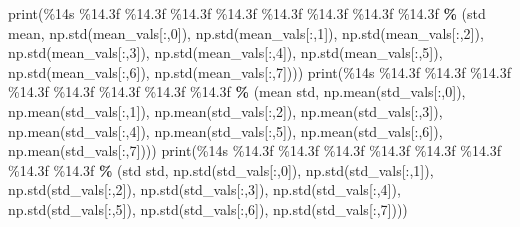 \documentclass[
]{book}
\newenvironment{Shaded}{\begin{snugshade}}{\end{snugshade}}
\newcommand{\BuiltInTok}[1]{#1}
\newcommand{\DecValTok}[1]{\textcolor[rgb]{0.00,0.00,0.81}{#1}}
\newcommand{\NormalTok}[1]{#1}
\newcommand{\OperatorTok}[1]{\textcolor[rgb]{0.81,0.36,0.00}{\textbf{#1}}}
\newcommand{\SpecialCharTok}[1]{\textcolor[rgb]{0.00,0.00,0.00}{#1}}
\newcommand{\StringTok}[1]{\textcolor[rgb]{0.31,0.60,0.02}{#1}}
\begin{document}
\begin{Shaded}
\begin{Highlighting}[]
  \BuiltInTok{print}\NormalTok{(}\StringTok{\textquotesingle{}}\SpecialCharTok{\%14s}\StringTok{ }\SpecialCharTok{\%14.3f}\StringTok{ }\SpecialCharTok{\%14.3f}\StringTok{ }\SpecialCharTok{\%14.3f}\StringTok{ }\SpecialCharTok{\%14.3f}\StringTok{ }\SpecialCharTok{\%14.3f}\StringTok{ }\SpecialCharTok{\%14.3f}\StringTok{ }\SpecialCharTok{\%14.3f}\StringTok{ }\SpecialCharTok{\%14.3f}\StringTok{\textquotesingle{}} \OperatorTok{\%}\NormalTok{ (}\StringTok{\textquotesingle{}std mean\textquotesingle{}}\NormalTok{, np.std(mean\_vals[:,}\DecValTok{0}\NormalTok{]), np.std(mean\_vals[:,}\DecValTok{1}\NormalTok{]), np.std(mean\_vals[:,}\DecValTok{2}\NormalTok{]), np.std(mean\_vals[:,}\DecValTok{3}\NormalTok{]), np.std(mean\_vals[:,}\DecValTok{4}\NormalTok{]), np.std(mean\_vals[:,}\DecValTok{5}\NormalTok{]), np.std(mean\_vals[:,}\DecValTok{6}\NormalTok{]), np.std(mean\_vals[:,}\DecValTok{7}\NormalTok{])))}
  \BuiltInTok{print}\NormalTok{(}\StringTok{\textquotesingle{}}\SpecialCharTok{\%14s}\StringTok{ }\SpecialCharTok{\%14.3f}\StringTok{ }\SpecialCharTok{\%14.3f}\StringTok{ }\SpecialCharTok{\%14.3f}\StringTok{ }\SpecialCharTok{\%14.3f}\StringTok{ }\SpecialCharTok{\%14.3f}\StringTok{ }\SpecialCharTok{\%14.3f}\StringTok{ }\SpecialCharTok{\%14.3f}\StringTok{ }\SpecialCharTok{\%14.3f}\StringTok{\textquotesingle{}} \OperatorTok{\%}\NormalTok{ (}\StringTok{\textquotesingle{}mean std\textquotesingle{}}\NormalTok{, np.mean(std\_vals[:,}\DecValTok{0}\NormalTok{]), np.mean(std\_vals[:,}\DecValTok{1}\NormalTok{]), np.mean(std\_vals[:,}\DecValTok{2}\NormalTok{]), np.mean(std\_vals[:,}\DecValTok{3}\NormalTok{]), np.mean(std\_vals[:,}\DecValTok{4}\NormalTok{]), np.mean(std\_vals[:,}\DecValTok{5}\NormalTok{]), np.mean(std\_vals[:,}\DecValTok{6}\NormalTok{]), np.mean(std\_vals[:,}\DecValTok{7}\NormalTok{])))}
  \BuiltInTok{print}\NormalTok{(}\StringTok{\textquotesingle{}}\SpecialCharTok{\%14s}\StringTok{ }\SpecialCharTok{\%14.3f}\StringTok{ }\SpecialCharTok{\%14.3f}\StringTok{ }\SpecialCharTok{\%14.3f}\StringTok{ }\SpecialCharTok{\%14.3f}\StringTok{ }\SpecialCharTok{\%14.3f}\StringTok{ }\SpecialCharTok{\%14.3f}\StringTok{ }\SpecialCharTok{\%14.3f}\StringTok{ }\SpecialCharTok{\%14.3f}\StringTok{\textquotesingle{}} \OperatorTok{\%}\NormalTok{ (}\StringTok{\textquotesingle{}std std\textquotesingle{}}\NormalTok{, np.std(std\_vals[:,}\DecValTok{0}\NormalTok{]), np.std(std\_vals[:,}\DecValTok{1}\NormalTok{]), np.std(std\_vals[:,}\DecValTok{2}\NormalTok{]), np.std(std\_vals[:,}\DecValTok{3}\NormalTok{]), np.std(std\_vals[:,}\DecValTok{4}\NormalTok{]), np.std(std\_vals[:,}\DecValTok{5}\NormalTok{]), np.std(std\_vals[:,}\DecValTok{6}\NormalTok{]), np.std(std\_vals[:,}\DecValTok{7}\NormalTok{])))}

\end{Highlighting}
\end{Shaded}
\end{document}
